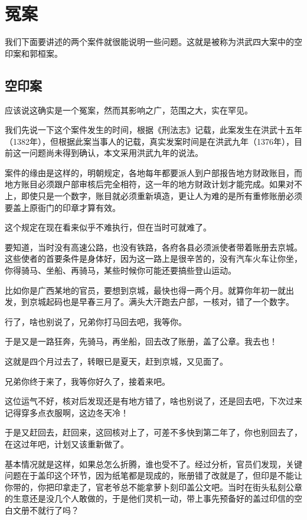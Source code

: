 \section{冤案}
\ifnum{}
	\begin{multicols}{\theparacolNo}
		\fi
		我们下面要讲述的两个案件就很能说明一些问题。这就是被称为洪武四大案中的空印案和郭桓案。

		\subsection{空印案}
		应该说这确实是一个冤案，然而其影响之广，范围之大，实在罕见。

		我们先说一下这个案件发生的时间，根据《刑法志》记载，此案发生在洪武十五年（1382年），但根据此案当事人的记载，真实发案时间是在洪武九年（1376年），目前这一问题尚未得到确认，本文采用洪武九年的说法。

		案件的缘由是这样的，明朝规定，各地每年都要派人到户部报告地方财政账目，而地方账目必须跟户部审核后完全相符，这一年的地方财政计划才能完成。如果对不上，即使只是一个数字，账目就必须重新填造，更让人为难的是所有重修账册必须要盖上原衙门的印章才算有效。

		这个规定在现在看来似乎不难执行，但在当时可就难了。

		要知道，当时没有高速公路，也没有铁路，各府各县必须派使者带着账册去京城。这些使者的首要条件是身体好，因为这一路上是很辛苦的，没有汽车火车让你坐，你得骑马、坐船、再骑马，某些时候你可能还要搞些登山运动。

		比如你是广西某地的官员，要想到京城，最快也得一两个月。就算你年初一就出发，到京城起码也是早春三月了。满头大汗跑去户部，一核对，错了一个数字。

		行了，啥也别说了，兄弟你打马回去吧，我等你。

		于是又是一路狂奔，先骑马，再坐船，回去改了账册，盖了公章。我去也！

		这就是四个月过去了，转眼已是夏天，赶到京城，又见面了。

		兄弟你终于来了，我等你好久了，接着来吧。

		这位运气不好，核对后发现还是有地方错了，啥也别说了，还是回去吧，下次过来记得穿多点衣服啊，这边冬天冷！

		于是又赶回去，赶回来，这回核对上了，可差不多快到第二年了，你也别回去了，在这过年吧，计划又该重新做了。

		基本情况就是这样，如果总怎么折腾，谁也受不了。经过分析，官员们发现，关键问题在于盖印这个环节，因为纸笔都是现成的，账册错了改就是了，但印是不能让你带的，你把印拿走了，官老爷总不能拿萝卜刻印盖公文吧。当时在街头私刻公章的生意还是没几个人敢做的，于是他们灵机一动，带上事先预备好的盖过印信的空白文册不就行了吗？


\end{multicols}

